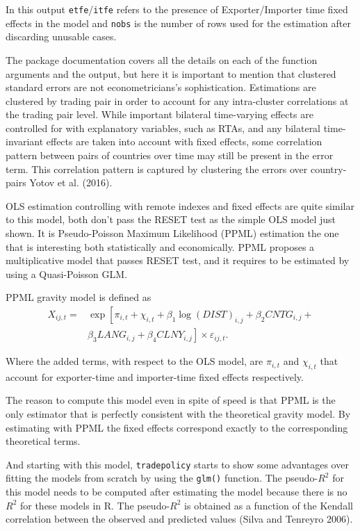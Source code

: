 \documentclass[12pt,reqno,oneside,pdftex]{formato-puc/puctesis} %
\begin{document}
In this output \texttt{etfe}/\texttt{itfe} refers to the presence of
Exporter/Importer time fixed effects in the model and \texttt{nobs} is
the number of rows used for the estimation after discarding unusable
cases.

The package documentation covers all the details on each of the function
arguments and the output, but here it is important to mention that
clustered standard errors are not econometricians's sophistication.
Estimations are clustered by trading pair in order to account for any
intra-cluster correlations at the trading pair level. While important
bilateral time-varying effects are controlled for with explanatory
variables, such as RTAs, and any bilateral time-invariant effects are
taken into account with fixed effects, some correlation pattern between
pairs of countries over time may still be present in the error term.
This correlation pattern is captured by clustering the errors over
country-pairs Yotov et al. (2016).

OLS estimation controlling with remote indexes and fixed effects are
quite similar to this model, both don't pass the RESET test as the
simple OLS model just shown. It is Pseudo-Poisson Maximum Likelihood
(PPML) estimation the one that is interesting both statistically and
economically. PPML proposes a multiplicative model that passes RESET
test, and it requires to be estimated by using a Quasi-Poisson GLM.

PPML gravity model is defined as \begin{align*}
X_{ij,t} =& \exp\left[\pi_{i,t} + \chi_{i,t} + \beta_1 \log(DIST)_{i,j} + \beta_2 CNTG_{i,j} +\right.\\
\text{ }& \left.\beta_3 LANG_{i,j} + \beta_4 CLNY_{i,j}\right] \times \varepsilon_{ij,t}.
\end{align*}

Where the added terms, with respect to the OLS model, are \(\pi_{i,t}\)
and \(\chi_{i,t}\) that account for exporter-time and importer-time
fixed effects respectively.

The reason to compute this model even in spite of speed is that PPML is
the only estimator that is perfectly consistent with the theoretical
gravity model. By estimating with PPML the fixed effects correspond
exactly to the corresponding theoretical terms.

And starting with this model, \texttt{tradepolicy} starts to show some
advantages over fitting the models from scratch by using the
\texttt{glm()} function. The pseudo-\(R^2\) for this model needs to be
computed after estimating the model because there is no \(R^2\) for
these models in R. The pseudo-\(R^2\) is obtained as a function of the
Kendall correlation between the observed and predicted values (Silva and
Tenreyro 2006).
\end{document}
